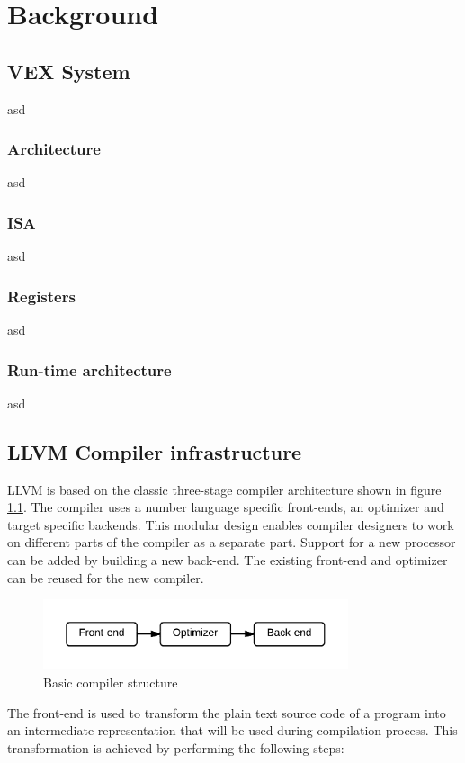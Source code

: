 \chapter{Background}
\section{VEX System}
asd
\subsection{Architecture}
asd
\subsection{ISA}
asd
\subsection{Registers}
asd
\subsection{Run-time architecture}
asd

\section{LLVM Compiler infrastructure}
LLVM is based on the classic three-stage compiler architecture shown in figure \ref{fig:compiler_structure}. The compiler uses a number language specific front-ends, an optimizer and target specific backends. This modular design enables compiler designers to work on different parts of the compiler as a separate part. Support for a new processor can be added by building a new back-end. The existing front-end and optimizer can be reused for the new compiler.

\begin{figure}[ph!]
\centering
\includegraphics[width=0.8\textwidth]{2_background/img/Basic_compiler.png}
\caption{Basic compiler structure}
\label{fig:compiler_structure}
\end{figure}

The front-end is used to transform the plain text source code of a program into an intermediate representation that will be used during compilation process. This transformation is achieved by performing the following steps:

